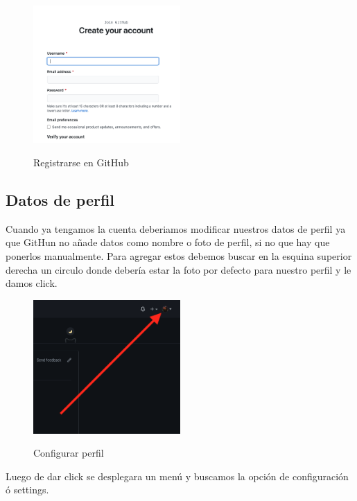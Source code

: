 \documentclass[11pt, oneside]{article}
\begin{document}
\begin{figure}[H]
  \centering
  \caption{Registrarse en GitHub}
  \includegraphics[width=0.50\textwidth]{./img/github-signup-2.png}
  \label{fig:github-signup-2}
\end{figure}

\subsection{Datos de perfil}

Cuando ya tengamos la cuenta deberiamos modificar nuestros datos de perfil ya que GitHun no añade datos como nombre o foto de perfil, si no que hay que ponerlos manualmente. Para agregar estos debemos buscar en la esquina superior derecha un circulo donde debería estar la foto por defecto para nuestro perfil y le damos click.

\begin{figure}[H]
  \centering
  \caption{Configurar perfil}
  \includegraphics[width=0.50\textwidth]{./img/git-profile-edit.png}
  \label{fig:github-profile-edit}
\end{figure}

Luego de dar click se desplegara un menú y buscamos la opción de configuración ó settings.
\end{document}
